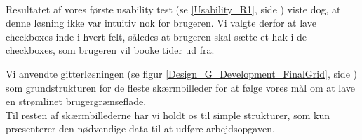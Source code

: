 \\Resultatet af vores første usability test (se \ref{Usability_R1}, side \pageref{Usability_R1}) viste dog, at denne løsning ikke var intuitiv nok for brugeren. Vi valgte derfor at lave checkboxes inde i hvert felt, således at brugeren skal sætte et hak i de checkboxes, som brugeren vil booke tider ud fra. 

Vi anvendte gitterløsningen (se figur \ref{Design_G_Development_FinalGrid}, side \pageref{Design_G_Development_FinalGrid}) som grundstrukturen for de fleste skærmbilleder for at følge vores mål om at lave en strømlinet brugergrænseflade. 
\\Til resten af skærmbillederne har vi holdt os til simple strukturer, som kun præsenterer den nødvendige data til at udføre arbejdsopgaven.